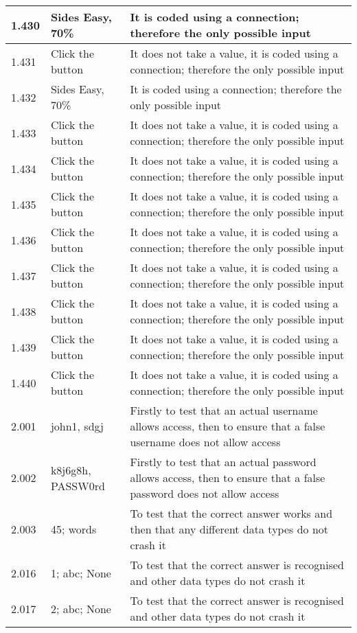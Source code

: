 \begin{landscape}
\begin{center}
\begin{longtable}{|p{4cm}|p{4cm}|p{5cm}|}
1.430 & Sides Easy, 70\% & It is coded using a connection; therefore the only possible input \\ \hline
1.431 & Click the button & It does not take a value, it is coded using a connection; therefore the only possible input \\ \hline
1.432 & Sides Easy, 70\% & It is coded using a connection; therefore the only possible input \\ \hline
1.433 & Click the button & It does not take a value, it is coded using a connection; therefore the only possible input \\ \hline
1.434 & Click the button & It does not take a value, it is coded using a connection; therefore the only possible input \\ \hline
1.435 & Click the button & It does not take a value, it is coded using a connection; therefore the only possible input \\ \hline
1.436 & Click the button & It does not take a value, it is coded using a connection; therefore the only possible input \\ \hline
1.437 & Click the button & It does not take a value, it is coded using a connection; therefore the only possible input \\ \hline
1.438 & Click the button & It does not take a value, it is coded using a connection; therefore the only possible input \\ \hline
1.439 & Click the button & It does not take a value, it is coded using a connection; therefore the only possible input \\ \hline
1.440 & Click the button & It does not take a value, it is coded using a connection; therefore the only possible input \\ \hline
2.001 & john1, sdgj & Firstly to test that an actual username allows access, then to ensure that a false username does not allow access \\ \hline
2.002 & k8j6g8h, PASSW0rd & Firstly to test that an actual password allows access, then to ensure that a false password does not allow access \\ \hline
2.003 & 45; words & To test that the correct answer works and then that any different data types do not crash it \\ \hline
2.016 & 1; abc; None & To test that the correct answer is recognised and other data types do not crash it \\ \hline
2.017 & 2; abc; None & To test that the correct answer is recognised and other data types do not crash it \\ \hline 

\end{longtable}
\end{center}
\end{landscape}
